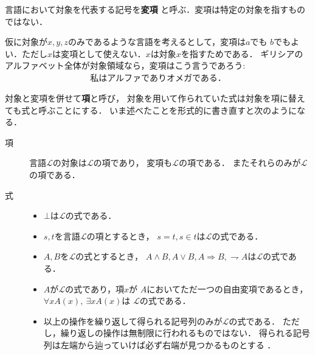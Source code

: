 	\begin{screen}
		\begin{dfn}[変項]
			言語において対象を代表する記号を{\bf 変項}
			と呼ぶ．変項は特定の対象を指すものではない．
		\end{dfn}
	\end{screen}
	
	仮に対象が$x,y,z$のみであるような言語を考えるとして，変項は$a$でも
	$b$でもよい．ただし$x$は変項として使えない．$x$は対象$x$を指すためである．
	ギリシアのアルファベット全体が対象領域なら，変項はこう言うであろう:
	\begin{align}
		\mbox{私はアルファでありオメガである．}
	\end{align}
	
	対象と変項を併せて{\bf 項}と呼び，
	対象を用いて作られていた式は対象を項に替えても式と呼ぶことにする．
	いま述べたことを形式的に書き直すと次のようになる．
	\begin{description}
		\item[項] 言語$\mathcal{L}$の対象は$\mathcal{L}$の項であり，
			変項も$\mathcal{L}$の項である．
			またそれらのみが$\mathcal{L}$の項である．
			
		\item[式] 
			\begin{itemize}
				\item $\bot$は$\mathcal{L}$の式である．
				
				\item $s,t$を言語$\mathcal{L}$の項とするとき，
					$s=t,s \in t$は$\mathcal{L}$の式である．
					
				\item $A,B$を$\mathcal{L}$の式とするとき，
					$A \wedge B,A \vee B,A\Longrightarrow B,
					\rightharpoondown A$は$\mathcal{L}$の式である．
				
				\item $A$が$\mathcal{L}$の式であり，項$x$が
					$A$においてただ一つの自由変項であるとき，
					$\forall x A(x),\ \exists x A(x)$は
					$\mathcal{L}$の式である．
				
				\item 以上の操作を繰り返して得られる記号列のみが$\mathcal{L}$の式である．
					ただし，繰り返しの操作は無制限に行われるものではない．
					得られる記号列は左端から辿っていけば必ず右端が見つかるものとする
					\footnotemark．
			\end{itemize}
	\end{description}
	
